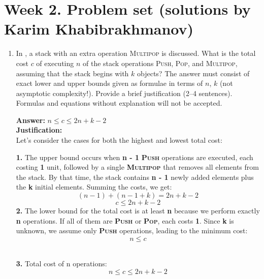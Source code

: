 \documentclass[dvipsnames]{article}
\begin{document}
\section*{Week 2. Problem set (solutions by Karim Khabibrakhmanov)}

\thispagestyle{fancy}

\begin{enumerate}

  \item In \cite[\S 16.1]{Cormen2022}, a stack with an extra operation \textsc{Multipop} is discussed.
  What is the total cost $c$ of executing $n$ of the stack operations \textsc{Push}, \textsc{Pop}, and \textsc{Multipop},
  assuming that the stack begins with $k$ objects?
  The answer must consist of exact lower and upper bounds given as formulae in terms of $n$, $k$ (not asymptotic complexity!).
  Provide a brief justification (2--4 sentences).
  Formulas and equations without explanation will not be accepted.

  \color{blue}
  \textbf{Answer:} \emph{$n \leq c \leq 2n + k - 2 $} \\
  \textbf{Justification: } \\
  Let’s consider the cases for both the highest and lowest total cost:\\
  \hspace*{5mm}
{\textbf{1.} The upper bound occurs when  \textbf{n - 1}  \textbf{\textsc{Push}} operations are executed, each costing \textbf{1}  unit, followed by a single \textbf{\textsc{Multipop}} that removes all elements from the stack. By that time, the stack contains  \textbf{n - 1}   newly added elements plus the  \textbf{k}   initial elements. Summing the costs, we get:\\
\[
(n - 1) + (n - 1 + k) = 2n + k - 2
\]
\[
c \leq 2n + k - 2
\]
   \hspace*{5mm}
  \textbf{2.}  The lower bound for the total cost is at least  \textbf{n}  because we perform exactly  \textbf{n}  operations. If all of them are \textbf{\textsc{Push}} or \textbf{\textsc{Pop}}, each costs \textbf{1}. Since  \textbf{k}  is unknown, we assume only \textbf{\textsc{Push}} operations, leading to the minimum cost:\\
\[
n \leq c
\]

\\
  \hspace*{5mm}
  \textbf{3.}  Total cost of n operations: \[n \leq c \leq 2n + k - 2\]

}
\end{enumerate}
\end{document}
